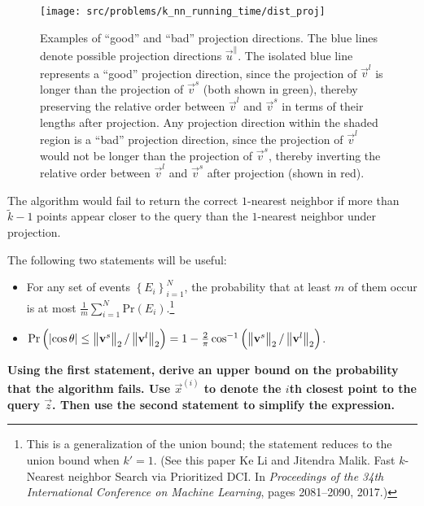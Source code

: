 \documentclass[preview]{standalone}
\begin{document}
\begin{Parts}
\begin{figure}[h]
    \centering
    \texttt{[image: src/problems/k\_nn\_running\_time/dist\_proj]}
    \caption{Examples of ``good'' and ``bad'' projection directions. 
        The blue lines denote possible projection directions $\vec{u}^{\parallel}$. The isolated blue line represents a ``good'' projection direction, since the projection of $\vec{v}^{l}$ is longer than the projection of $\vec{v}^{s}$ (both shown in green), thereby preserving the relative order between $\vec{v}^{l}$ and $\vec{v}^{s}$ in terms of their lengths after projection. 
    Any projection direction within the shaded region is a ``bad'' projection direction, since the projection of $\vec{v}^{l}$ would not be longer than the projection of $\vec{v}^{s}$, thereby inverting the relative order between $\vec{v}^{l}$ and $\vec{v}^{s}$ after projection (shown in red). 
        }
\end{figure}



\Part

The algorithm would fail to return the correct $1$-nearest neighbor if more than $\tilde{k}-1$ points appear closer to the query than the $1$-nearest neighbor under projection. 

The following two statements will be useful:
\begin{itemize}

\item For any set of events $\left\{ E_{i}\right\} _{i=1}^{N}$, the probability that at least $m$ of them occur is at most $\frac{1}{m}\sum_{i=1}^{N}\mathrm{Pr}\left(E_{i}\right)$.\footnote{This is a generalization of the union bound; the statement reduces to the union bound when $k'=1$. (See this paper Ke Li and Jitendra Malik. Fast $k$-Nearest neighbor Search via Prioritized DCI. In \emph{Proceedings of the 34th International Conference on Machine Learning}, pages 2081--2090, 2017.)}
\item
$\mathrm{Pr}\left(\left|\cos\theta\right| \leq \left\Vert \vec{v}^{s}\vphantom{v^{l}}\right\Vert _{2} / \left\Vert \vec{v}^{l}\right\Vert _{2}\right) = 1-\frac{2}{\pi}\cos^{-1}\left(\left\Vert \vec{v}^{s}\vphantom{v^{l}}\right\Vert _{2}/\left\Vert \vec{v}^{l}\right\Vert _{2}\right)$. 
\end{itemize}



{\bf Using the first statement, derive an upper bound on the probability that the algorithm fails. Use $\vec{x}^{(i)}$ to denote the $i$th closest point to the query $\vec{z}$. Then use the second statement to simplify the expression.}




\end{Parts}
\end{document}
